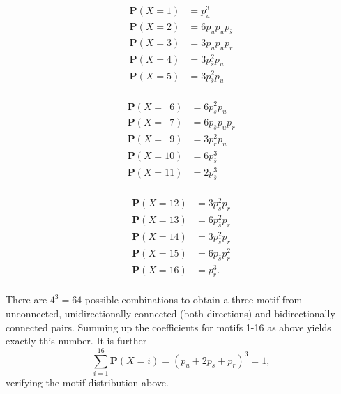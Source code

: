 \begin{minipage}{\linewidth}
  \begin{minipage}[c]{0.32\textwidth}
    \begin{align*}
      \mathbf{P}(X=1) &    =   p_u^3  \\
      \mathbf{P}(X=2) &    =   6 p_u p_u p_{\bar{s}}\\
      \mathbf{P}(X=3) &    =   3 p_u p_u p_r\\
      \mathbf{P}(X=4) &    =   3 p_{\bar{s}}^2 p_u\\
      \mathbf{P}(X=5) &    =   3 p_{\bar{s}}^2 p_u\\
    \end{align*}
  \end{minipage}%
  \begin{minipage}[c]{0.32\textwidth}
    \begin{align*}
      \mathbf{P}(X=\,\,\,6) &    =   6 p_{\bar{s}}^2 p_u\\
      \mathbf{P}(X=\,\,\,7) &    =   6 p_{\bar{s}} p_u p_r\\
      \mathbf{P}(X=\,\,\,9) &    =   3 p_r^2 p_u\\
      \mathbf{P}(X=10) &   =   6 p_{\bar{s}}^3   \\
      \mathbf{P}(X=11) &   =   2 p_{\bar{s}}^3    \\
    \end{align*}
  \end{minipage}%
  \begin{minipage}[c]{0.32\textwidth}
    \begin{align*}
      \mathbf{P}(X=12) &   =   3 p_{\bar{s}}^2 p_r\\
      \mathbf{P}(X=13) &   =   6 p_{\bar{s}}^2 p_r\\
      \mathbf{P}(X=14) &   =   3 p_{\bar{s}}^2 p_r\\
      \mathbf{P}(X=15) &   =   6 p_{\bar{s}} p_r^2\\
      \mathbf{P}(X=16) &   =   p_r^3.\\
    \end{align*}
  \end{minipage}  
\end{minipage}

There are $4^3 = 64$ possible combinations to obtain a three motif
from unconnected, unidirectionally connected (both directions) and
bidirectionally connected pairs. Summing up the coefficients for
motifs 1-16 as above yields exactly this number. It is further
\[\sum_{i=1}^{16} \mathbf{P}(X=i) = (p_u+2p_{\bar{s}}+p_r)^3 = 1,\]
verifying the motif distribution above.
